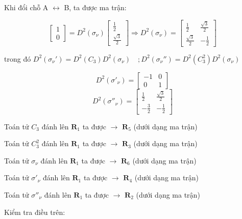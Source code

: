 \documentclass{report}
\begin{document}
Khi đổi chỗ A $\leftrightarrow$ B, ta được ma trận:

\[
    \renewcommand{\arraystretch}{0.75}
    \begin{bmatrix}
        1 \\
        0
    \end{bmatrix}
    = D^2(\sigma_\nu)
    \begin{bmatrix}
        \frac{1}{2} \\
        \frac{\sqrt{3}}{2}
    \end{bmatrix}
    \Rightarrow  D^2(\sigma_\nu) =
    \begin{bmatrix}
        \frac{1}{2}        & \frac{\sqrt{3}}{2} \\
        \frac{\sqrt{3}}{2} & -\frac{1}{2}
    \end{bmatrix}
\]

trong đó $ D^2\left(\sigma_\nu'\right) = D^2 \left(C_3\right) D^2\left(\sigma_\nu\right)\quad ; D^2\left(\sigma_\nu''\right) = D^2 \left(C_3^2\right) D^2\left(\sigma_\nu\right) $


\[
    \renewcommand{\arraystretch}{0.75}
    D^2\left(\sigma'_\nu\right) =
    \begin{bmatrix}
        -1 & 0 \\
        0  & 1
    \end{bmatrix}
\]
\[
    \renewcommand{\arraystretch}{0.75}
    D^2\left(\sigma''_\nu\right) =
    \begin{bmatrix}
        \frac{1}{2}  & \frac{\sqrt{3}}{2} \\
        -\frac{3}{2} & -\frac{1}{2}
    \end{bmatrix}
\]

Toán tử $C_3$ đánh lên $\textbf{R}_1$ ta được $\rightarrow$ $\textbf{R}_5$ (dưới dạng ma trận)

Toán tử $C_3^2$ đánh lên $\textbf{R}_1$ ta được $\rightarrow$ $\textbf{R}_3$ (dưới dạng ma trận)

Toán tử $\sigma_\nu$ đánh lên $\textbf{R}_1$ ta được $\rightarrow$ $\textbf{R}_6$ (dưới dạng ma trận)

Toán tử $\sigma'_\nu$ đánh lên $\textbf{R}_1$ ta được $\rightarrow$ $\textbf{R}_4$ (dưới dạng ma trận)

Toán tử $\sigma''_\nu$ đánh lên $\textbf{R}_1$ ta được $\rightarrow$ $\textbf{R}_2$ (dưới dạng ma trận)

Kiểm tra điều trên:
\end{document}
